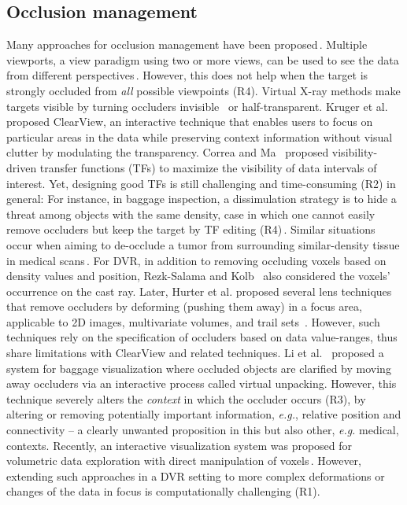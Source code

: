 \subsection{Occlusion management}
%
Many approaches for occlusion management have been proposed\,\cite{4483791}. Multiple viewports, a view paradigm using two or more views, can be used to see the data from different perspectives\,\cite{WangBaldonado:2000:GUM:345513.345271}. However, this does not help when the target is strongly occluded from \emph{all} possible viewpoints (R4). Virtual X-ray methods make targets visible by turning occluders invisible~\cite{Burns:2008:ACC:1457515.1409107} or half-transparent. Kruger et al.~\cite{4015450} proposed ClearView, an interactive technique that enables users to focus on particular areas in the data while preserving context information without visual clutter by modulating the transparency. Correa and Ma~\cite{5416704} proposed visibility-driven transfer functions (TFs) to maximize the visibility of data intervals of interest. Yet, designing good TFs is still challenging and time-consuming (R2) in general: For instance, in baggage inspection, a dissimulation strategy is to hide a threat among objects with the same density, case in which one cannot easily remove occluders but keep the target by TF editing (R4)\,\cite{7819413}. Similar situations occur when aiming to de-occlude a tumor from surrounding similar-density tissue in medical scans\,\cite{CGF:CGF12927}. For DVR, in addition to removing occluding voxels based on density values and position, Rezk-Salama and Kolb~\cite{CGF:CGF979} also considered the voxels' occurrence on the cast ray. Later, Hurter et al. proposed several lens techniques that remove occluders by deforming (pushing them away) in a focus area, applicable to 2D images, multivariate volumes, and trail sets~\cite{moleview,6787171}. However, such techniques rely on the specification of occluders based on data value-ranges, thus share limitations with ClearView and related techniques. Li et al.~\cite{Li:2012:LVV:2425296.2425325} proposed a system for baggage visualization where occluded objects are clarified by moving away occluders via an interactive process called virtual unpacking. However, this technique severely alters the \emph{context} in which the occluder occurs (R3), by altering or removing potentially important information, \emph{e.g.}, relative position and connectivity -- a clearly unwanted proposition in this but also other, \emph{e.g.} medical, contexts. Recently, an interactive visualization system was proposed for volumetric data exploration with direct manipulation of voxels\,\cite{7819413}. However, extending such approaches in a DVR setting to more complex deformations or changes of the data in focus is computationally challenging (R1).


